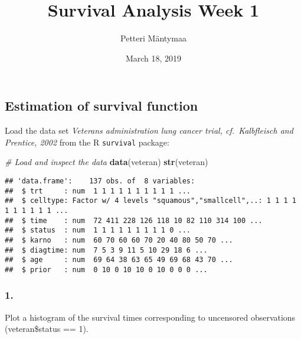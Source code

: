 \documentclass[]{article}
\title{Survival Analysis Week 1}
\author{Petteri Mäntymaa}
\date{March 18, 2019}
\newenvironment{Shaded}{\begin{snugshade}}{\end{snugshade}}
\newcommand{\KeywordTok}[1]{\textcolor[rgb]{0.13,0.29,0.53}{\textbf{#1}}}
\newcommand{\CommentTok}[1]{\textcolor[rgb]{0.56,0.35,0.01}{\textit{#1}}}
\newcommand{\NormalTok}[1]{#1}
\begin{document}
\maketitle

\subsection{Estimation of survival
function}\label{estimation-of-survival-function}

Load the data set \emph{Veterans administration lung cancer trial,
cf.~Kalbfleisch and Prentice, 2002} from the R \texttt{survival}
package:

\begin{Shaded}
\begin{Highlighting}[]
\CommentTok{# Load and inspect the data}
\KeywordTok{data}\NormalTok{(veteran)}
\KeywordTok{str}\NormalTok{(veteran)}
\end{Highlighting}
\end{Shaded}

\begin{verbatim}
## 'data.frame':    137 obs. of  8 variables:
##  $ trt     : num  1 1 1 1 1 1 1 1 1 1 ...
##  $ celltype: Factor w/ 4 levels "squamous","smallcell",..: 1 1 1 1 1 1 1 1 1 1 ...
##  $ time    : num  72 411 228 126 118 10 82 110 314 100 ...
##  $ status  : num  1 1 1 1 1 1 1 1 1 0 ...
##  $ karno   : num  60 70 60 60 70 20 40 80 50 70 ...
##  $ diagtime: num  7 5 3 9 11 5 10 29 18 6 ...
##  $ age     : num  69 64 38 63 65 49 69 68 43 70 ...
##  $ prior   : num  0 10 0 10 10 0 10 0 0 0 ...
\end{verbatim}

\subsubsection{1.}\label{section}

Plot a histogram of the survival times corresponding to uncensored
observations (veteran\$status == 1).
\end{document}
